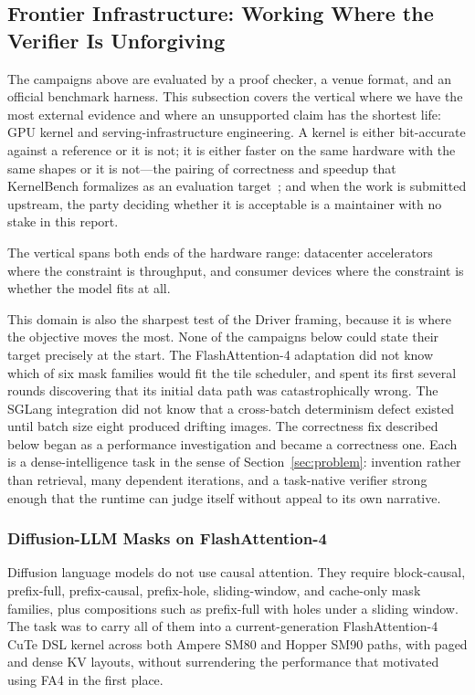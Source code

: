 \subsection{Frontier Infrastructure: Working Where the Verifier Is Unforgiving}
\label{sec:infra-vertical}

The campaigns above are evaluated by a proof checker, a venue format, and an
official benchmark harness. This subsection covers the vertical where we have the
most external evidence and where an unsupported claim has the shortest life: GPU
kernel and serving-infrastructure engineering. A kernel is either bit-accurate
against a reference or it is not; it is either faster on the same hardware with the
same shapes or it is not---the pairing of correctness and speedup that
KernelBench formalizes as an evaluation target~\citep{ouyang2025kernelbench}; and when the work is submitted upstream, the party
deciding whether it is acceptable is a maintainer with no stake in this report.

The vertical spans both ends of the hardware range: datacenter accelerators where
the constraint is throughput, and consumer devices where the constraint is whether
the model fits at all.

This domain is also the sharpest test of the Driver framing, because it is where the
objective moves the most. None of the campaigns below could state their target
precisely at the start. The FlashAttention-4 adaptation did not know which of six
mask families would fit the tile scheduler, and spent its first several rounds
discovering that its initial data path was catastrophically wrong. The SGLang
integration did not know that a cross-batch determinism defect existed until
batch size eight produced drifting images. The correctness fix described below began
as a performance investigation and became a correctness one. Each is a
dense-intelligence task in the sense of Section~\ref{sec:problem}: invention rather
than retrieval, many dependent iterations, and a task-native verifier strong enough
that the runtime can judge itself without appeal to its own narrative.

\subsubsection{Diffusion-LLM Masks on FlashAttention-4}

Diffusion language models do not use causal attention. They require block-causal,
prefix-full, prefix-causal, prefix-hole, sliding-window, and cache-only mask
families, plus compositions such as prefix-full with holes under a sliding window.
The task was to carry all of them into a current-generation FlashAttention-4 CuTe
DSL kernel across both Ampere SM80 and Hopper SM90 paths, with paged and dense KV
layouts, without surrendering the performance that motivated using FA4 in the first
place.

